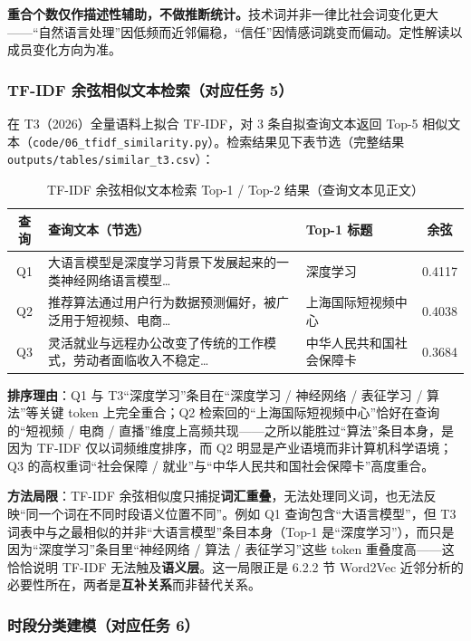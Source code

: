 \documentclass[12pt,a4paper]{article}
\begin{document}
\textbf{重合个数仅作描述性辅助，不做推断统计。}技术词并非一律比社会词变化更大——“自然语言处理”因低频而近邻偏稳，“信任”因情感词跳变而偏动。定性解读以成员变化方向为准。

\subsubsection{TF-IDF 余弦相似文本检索（对应任务 5）}

在 T3（2026）全量语料上拟合 TF-IDF，对 3 条自拟查询文本返回 Top-5 相似文本（\texttt{code/06\_tfidf\_similarity.py}）。检索结果见下表节选（完整结果 \texttt{outputs/tables/similar\_t3.csv}）：

\begin{table}[H]
\centering
\caption{TF-IDF 余弦相似文本检索 Top-1 / Top-2 结果（查询文本见正文）}
\renewcommand{\arraystretch}{1.25}
\footnotesize
\begin{tabularx}{\textwidth}{|c|X|l|c|}
\hline
\textbf{查询} & \textbf{查询文本（节选）} & \textbf{Top-1 标题} & \textbf{余弦} \\
\hline
Q1 & 大语言模型是深度学习背景下发展起来的一类神经网络语言模型… & 深度学习 & 0.4117 \\
\hline
Q2 & 推荐算法通过用户行为数据预测偏好，被广泛用于短视频、电商… & 上海国际短视频中心 & 0.4038 \\
\hline
Q3 & 灵活就业与远程办公改变了传统的工作模式，劳动者面临收入不稳定… & 中华人民共和国社会保障卡 & 0.3684 \\
\hline
\end{tabularx}
\end{table}

\textbf{排序理由}：Q1 与 T3“深度学习”条目在“深度学习 / 神经网络 / 表征学习 / 算法”等关键 token 上完全重合；Q2 检索回的“上海国际短视频中心”恰好在查询的“短视频 / 电商 / 直播”维度上高频共现——之所以能胜过“算法”条目本身，是因为 TF-IDF 仅以词频维度排序，而 Q2 明显是产业语境而非计算机科学语境；Q3 的高权重词“社会保障 / 就业”与“中华人民共和国社会保障卡”高度重合。

\textbf{方法局限}：TF-IDF 余弦相似度只捕捉\textbf{词汇重叠}，无法处理同义词，也无法反映“同一个词在不同时段语义位置不同”。例如 Q1 查询包含“大语言模型”，但 T3 词表中与之最相似的并非“大语言模型”条目本身（Top-1 是“深度学习”），而只是因为“深度学习”条目里“神经网络 / 算法 / 表征学习”这些 token 重叠度高——这恰恰说明 TF-IDF 无法触及\textbf{语义层}。这一局限正是 6.2.2 节 Word2Vec 近邻分析的必要性所在，两者是\textbf{互补关系}而非替代关系。

\subsubsection{时段分类建模（对应任务 6）}
\end{document}
